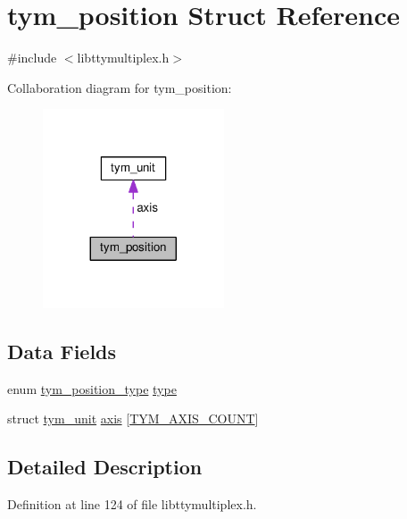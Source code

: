 \hypertarget{structtym__position}{}\section{tym\+\_\+position Struct Reference}
\label{structtym__position}


{\ttfamily \#include $<$libttymultiplex.\+h$>$}



Collaboration diagram for tym\+\_\+position\+:
\nopagebreak
\begin{figure}[H]
\begin{center}
\leavevmode
\includegraphics[width=152pt]{structtym__position__coll__graph}
\end{center}
\end{figure}
\subsection*{Data Fields}
\begin{DoxyCompactItemize}
\item 
enum \hyperlink{libttymultiplex_8h_a23b539c9dc1c137633f8783517fc2653}{tym\+\_\+position\+\_\+type} \hyperlink{structtym__position_a71682a3bc5e8e9e67f3cfadf0768d73d}{type}
\item 
struct \hyperlink{structtym__unit}{tym\+\_\+unit} \hyperlink{structtym__position_a1973e10af9a7a40d13da23ea6ec75b71}{axis} \mbox{[}\hyperlink{libttymultiplex_8h_a6b9111693b9da18b1f567760f5bc17beab5ce57254240d63c232aba1d7552322f}{T\+Y\+M\+\_\+\+A\+X\+I\+S\+\_\+\+C\+O\+U\+NT}\mbox{]}
\end{DoxyCompactItemize}


\subsection{Detailed Description}


Definition at line 124 of file libttymultiplex.\+h.



